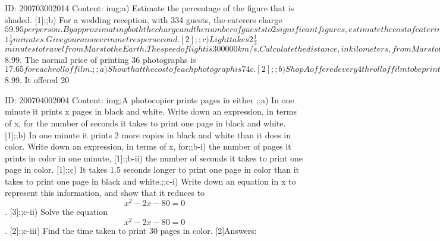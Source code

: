 \documentclass{article}
\begin{document}
ID: 200703002014
Content:
img;a) Estimate the percentage of the figure that is shaded. [1];;b) For a wedding reception, with 334 guests, the caterers charge $59.95 per person. By approximating both the charge and the number of guests to 2 significant figures, estimate the cost of catering for the reception. Show your working and give your answer to a reasonable degree of accuracy. [2]Answers:

ID: 200703002016
Content:
img;The two triangles in the diagram are similar.;;a) State the angle equal to angle AEC. [1];;b) Given that AB = 12 cm, BC = 3 cm and CD = 5 cm, calculate DE. [2]Answers:

ID: 200703002020
Content:
a) Calculate the time it takes a bullet to travel 100 m at a speed of 5000 m/s. Give your answer in seconds. [1];;b) Calculate the average speed of an insect which travels 450 cm in $$1\frac{1}{2}$$ minutes. Give your answer in metres per second. [2];;c) Light takes $$2\frac{1}{3}$$ minutes to travel from Mars to the Earth. The speed of light is 300000 km/s. Calculate the distance, in kilometers, from Mars to the Earth. [2]Answers:

ID: 200704002001
Content:
The normal price of a roll of film for 36 photographs is $8.99. The normal price of printing 36 photographs is $17.65 for each roll of film.;;a) Show that the cost of each photograph is 74c. [2];;b) Shop A offered every 4th roll of film to be printed free. What is the price of each photograph? ;;c) Shop B kept the price of each roll of film at $8.99. It offered 20%

ID: 200704002004
Content:
img;A photocopier prints pages in either ;;a) In one minute it prints x pages in black and white. Write down an expression, in terms of x, for the number of seconds it takes to print one page in black and white. [1];;b) In one minute it prints 2 more copies in black and white than it does in color. Write down an expression, in terms of x, for;;b-i) the number of pages it prints in color in one minute, [1];;b-ii) the number of seconds it takes to print one page in color. [1];;c) It takes 1.5 seconds longer to print one page in color than it takes to print one page in black and white.;;c-i) Write down an equation in x to represent this information, and show that it reduces to $$x^{2} -2x-80=0$$. [3];;c-ii) Solve the equation $$x^{2} -2x-80=0$$. [2];;c-iii) Find the time taken to print 30 pages in color. [2]Answers:
\end{document}
